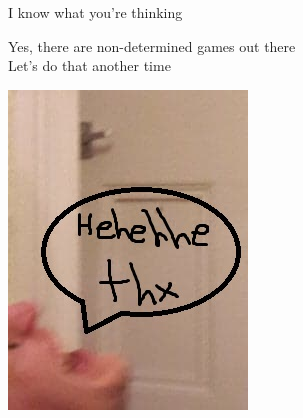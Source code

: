\documentclass{beamer}
\begin{document}
\begin{frame}{I know what you're thinking}
	\begin{center}
		\pause Yes, there are non-determined games out there\\\vspace{.2cm}
		\pause Let's do that another time\\\vspace{.8cm}
	\end{center}
\end{frame}

\begin{frame}
	\begin{center}
		\includegraphics[scale=.8]{gfx/nick2.jpg}
	\end{center}
\end{frame}
\end{document}
